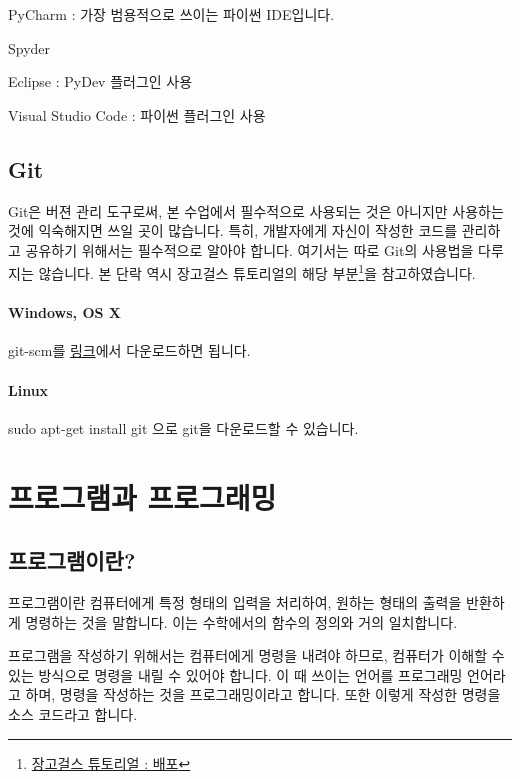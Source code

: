 \documentclass[twoside]{article}
\begin{document}
\begin{compactitem} 
\item PyCharm : 가장 범용적으로 쓰이는 파이썬 IDE입니다. 
\item Spyder 
\item Eclipse : PyDev 플러그인 사용 
\item Visual Studio Code : 파이썬 플러그인 사용
\end{compactitem} 

\subsection{Git}

Git은 버젼 관리 도구로써, 본 수업에서 필수적으로 사용되는 것은 아니지만 사용하는 것에 익숙해지면 쓰일 곳이 많습니다. 특히, 개발자에게 자신이 작성한 코드를 관리하고 공유하기 위해서는 필수적으로 알아야 합니다. 여기서는 따로 Git의 사용법을 다루지는 않습니다. 본 단락 역시 장고걸스 튜토리얼의 해당 부분\footnote{\href{https://tutorial.djangogirls.org/ko/deploy/}{장고걸스 튜토리얼 : 배포}}을 참고하였습니다. 

\paragraph{Windows, OS X} 

git-scm를 \href{git-scm.com}{링크}에서 다운로드하면 됩니다. 

\paragraph{Linux} 

sudo apt-get install git 으로 git을 다운로드할 수 있습니다. 


\section{프로그램과 프로그래밍} 

\subsection{프로그램이란?} 

프로그램이란 컴퓨터에게 특정 형태의 입력을 처리하여, 원하는 형태의 출력을 반환하게 명령하는 것을 말합니다. 이는 수학에서의 함수의 정의와 거의 일치합니다. 

프로그램을 작성하기 위해서는 컴퓨터에게 명령을 내려야 하므로, 컴퓨터가 이해할 수 있는 방식으로 명령을 내릴 수 있어야 합니다. 이 때 쓰이는 언어를 프로그래밍 언어라고 하며, 명령을 작성하는 것을 프로그래밍이라고 합니다. 또한 이렇게 작성한 명령을 소스 코드라고 합니다. 
\end{document}
